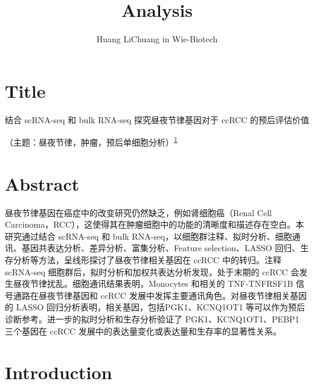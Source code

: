 \documentclass[
]{article}
\title{Analysis}
\author{Huang LiChuang in Wie-Biotech}
\date{}
\begin{document}
\maketitle

{
\setcounter{tocdepth}{3}
\tableofcontents
}
\listoffigures

\listoftables

\hypertarget{title}{%
\section{Title}\label{title}}

结合 scRNA-seq 和 bulk RNA-seq 探究昼夜节律基因对于 ccRCC 的预后评估价值

（主题：昼夜节律，肿瘤，预后单细胞分析）\textsuperscript{\protect\hyperlink{ref-SingleCellTraHeLe2022}{1}}

\hypertarget{abstract}{%
\section{Abstract}\label{abstract}}

昼夜节律基因在癌症中的改变研究仍然缺乏，例如肾细胞癌（Renal Cell Carcinoma，RCC），这使得其在肿瘤细胞中的功能的清晰度和描述存在空白。本研究通过结合 scRNA-seq 和 bulk RNA-seq，以细胞群注释、拟时分析、细胞通讯、基因共表达分析、差异分析、富集分析、Feature selection、LASSO 回归、生存分析等方法，呈线形探讨了昼夜节律相关基因在 ccRCC 中的转归。注释 scRNA-seq 细胞群后，拟时分析和加权共表达分析发现，处于末期的 ccRCC 会发生昼夜节律扰乱。细胞通讯结果表明，Monocytes 和相关的 TNF-TNFRSF1B 信号通路在昼夜节律基因和 ccRCC 发展中发挥主要通讯角色。对昼夜节律相关基因的 LASSO 回归分析表明，相关基因，包括PGK1、KCNQ1OT1 等可以作为预后诊断参考。进一步的拟时分析和生存分析验证了 PGK1、KCNQ1OT1、PEBP1 三个基因在 ccRCC 发展中的表达量变化或表达量和生存率的显著性关系。

\hypertarget{introduction}{%
\section{Introduction}\label{introduction}}
\end{document}
